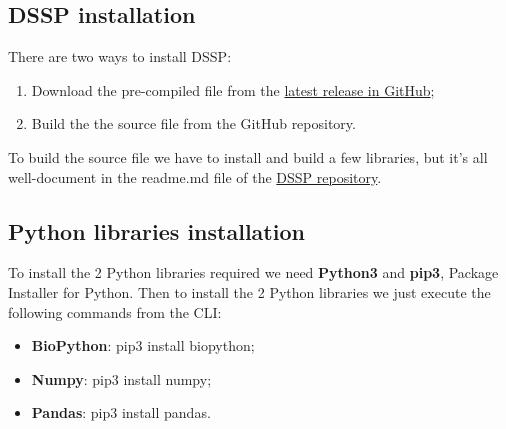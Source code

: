 \subsection{DSSP installation}
There are two ways to install DSSP: 
\begin{enumerate}
    \item Download the pre-compiled file from the  \href{https://github.com/PDB-REDO/dssp/releases/tag/v4.4.0}{latest release in GitHub};
    \item Build the the source file from the GitHub repository.
\end{enumerate}
To build the source file we have to install and build a few libraries, but it's all well-document in the readme.md file of the \href{https://github.com/PDB-REDO/dssp}{DSSP repository}. 

\subsection{Python libraries installation}
To install the 2 Python libraries required we need \textbf{Python3} and \textbf{pip3}, Package Installer for Python. Then to install the 2 Python libraries we just execute the following commands from the CLI:
\begin{itemize}
    \item \textbf{BioPython}: pip3 install biopython;
    \item \textbf{Numpy}: pip3 install numpy;
    \item \textbf{Pandas}: pip3 install pandas.
\end{itemize}